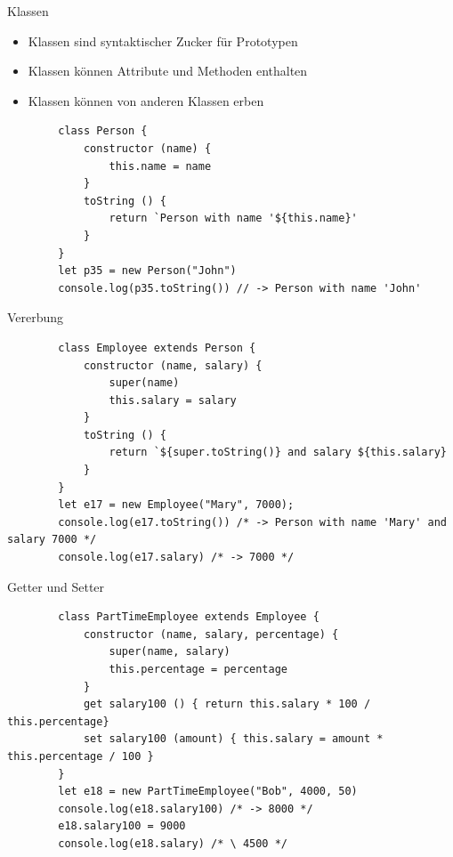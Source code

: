 \begin{code}{Klassen}
    \begin{itemize}
        \item Klassen sind syntaktischer Zucker für Prototypen
        \item Klassen können Attribute und Methoden enthalten
        \item Klassen können von anderen Klassen erben
    \end{itemize}

    \begin{verbatim}
        class Person {
            constructor (name) {
                this.name = name
            }
            toString () {
                return `Person with name '${this.name}'
            }
        }
        let p35 = new Person("John")
        console.log(p35.toString()) // -> Person with name 'John'
        \end{verbatim}
\end{code}

\begin{code}{Vererbung}
    \begin{verbatim}
        class Employee extends Person {
            constructor (name, salary) {
                super(name)
                this.salary = salary
            }
            toString () {
                return `${super.toString()} and salary ${this.salary}
            }
        }
        let e17 = new Employee("Mary", 7000);
        console.log(e17.toString()) /* -> Person with name 'Mary' and salary 7000 */
        console.log(e17.salary) /* -> 7000 */
        \end{verbatim}
\end{code}

\begin{code}{Getter und Setter}
    \begin{verbatim}
        class PartTimeEmployee extends Employee {
            constructor (name, salary, percentage) {
                super(name, salary)
                this.percentage = percentage
            }
            get salary100 () { return this.salary * 100 / this.percentage}
            set salary100 (amount) { this.salary = amount * this.percentage / 100 }
        }
        let e18 = new PartTimeEmployee("Bob", 4000, 50)
        console.log(e18.salary100) /* -> 8000 */
        e18.salary100 = 9000
        console.log(e18.salary) /* \ 4500 */
        \end{verbatim}
\end{code}

